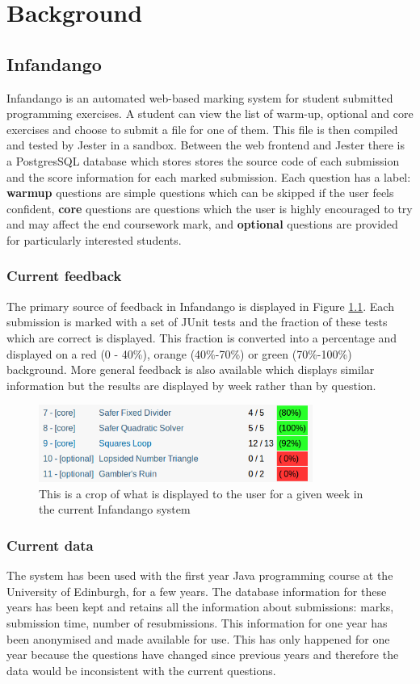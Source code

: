 \chapter{Background}
\label{background}
\section{Infandango}
Infandango is an automated web-based marking system for student submitted programming exercises. A student can view the list of warm-up, optional and core exercises and choose to submit a file for one of them. This file is then compiled and tested by Jester in a sandbox. Between the web frontend and Jester there is a PostgresSQL database which stores stores the source code of each submission and the score information for each marked submission.
Each question has a label: {\bf warmup} questions are simple questions which can be skipped if the user feels confident, {\bf core} questions are questions which the user is highly encouraged to try and may affect the end coursework mark, and {\bf optional} questions are provided for particularly interested students.
\subsection{Current feedback}
The primary source of feedback in Infandango is displayed in Figure \ref{fig:currentfeedback}. Each submission is marked with a set of JUnit tests and the fraction of these tests which are correct is displayed. This fraction is converted into a percentage and displayed on a red (0 - 40\%), orange (40\%-70\%) or green (70\%-100\%) background.
More general feedback is also available which displays similar information but the results are displayed by week rather than by question. 

\begin{figure}[h!]
\centering
\includegraphics[width=0.8\textwidth]{images/currentfeedback.png}
\caption{This is a crop of what is displayed to the user for a given week in the current Infandango system}
\label{fig:currentfeedback}
\end{figure}

\subsection{Current data}
The system has been used with the first year Java programming course at the University of Edinburgh, for a few years. The database information for these years has been kept and retains all the information about submissions: marks, submission time, number of resubmissions. This information for one year has been anonymised and made available for use. This has only happened for one year because the questions have changed since previous years and therefore the data would be inconsistent with the current questions.

